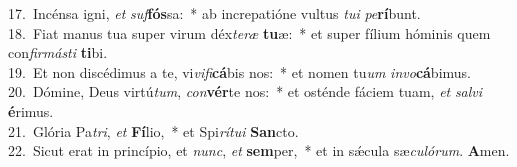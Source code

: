 {17.~}Incénsa igni, \textit{et} \textit{suf}\textbf{fós}sa:~* ab increpatióne vultus \textit{tu}\textit{i} \textit{pe}\textbf{rí}bunt.\\
{18.~}Fiat manus tua super virum déx\textit{te}\textit{ræ} \textbf{tu}æ:~* et super fílium hóminis quem con\textit{fir}\textit{má}\textit{sti} \textbf{ti}bi.\\
{19.~}Et non discédimus a te, vi\textit{vi}\textit{fi}\textbf{cá}bis nos:~* et nomen tu\textit{um} \textit{in}\textit{vo}\textbf{cá}bimus.\\
{20.~}Dómine, Deus virtú\textit{tum}, \textit{con}\textbf{vér}te nos:~* et osténde fáciem tuam, \textit{et} \textit{sal}\textit{vi} \textbf{é}rimus.\\
{21.~}Glória Pa\textit{tri}, \textit{et} \textbf{Fí}lio,~* et Spi\textit{rí}\textit{tu}\textit{i} \textbf{San}cto.\\
{22.~}Sicut erat in princípio, et \textit{nunc}, \textit{et} \textbf{sem}per,~* et in sǽcula sæ\textit{cu}\textit{ló}\textit{rum}. \textbf{A}men.\\
